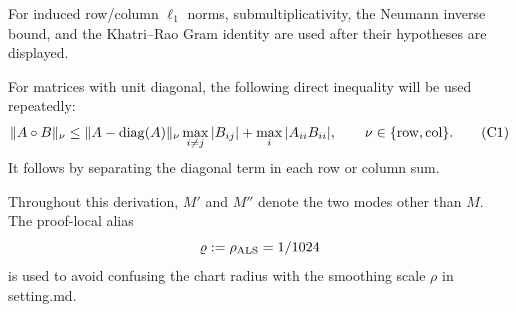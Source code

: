 For induced row/column $\ell_1$ norms, submultiplicativity, the Neumann inverse bound, and the Khatri--Rao Gram identity are used after their hypotheses are displayed.

For matrices with unit diagonal, the following direct inequality will be
   used repeatedly:
   \[
   \|A\circ B\|_\nu
   \le \|A-\operatorname{diag}(A)\|_\nu
      \max_{i\ne j}|B_{ij}|
   +\max_i|A_{ii}B_{ii}|,
   \qquad \nu\in\{{\rm row},{\rm col}\}.
   \tag{C1}
   \]
   It follows by separating the diagonal term in each row or column sum.

Throughout this derivation, \(M'\) and \(M''\) denote the two modes other
than \(M\). The proof-local alias
\[
\varrho:=\rho_{\rm ALS}=1/1024
\]
is used to avoid confusing the chart radius with the smoothing scale
\(\rho\) in setting.md.


